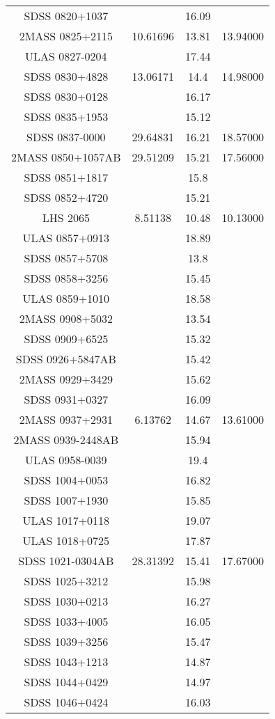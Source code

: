 \begin{table}
\begin{tabular}{cccc}
SDSS 0820+1037 &  & 16.09 &  \\
2MASS 0825+2115 & 10.61696 & 13.81 & 13.94000 \\
ULAS 0827-0204 &  & 17.44 &  \\
SDSS 0830+4828 & 13.06171 & 14.4 & 14.98000 \\
SDSS 0830+0128 &  & 16.17 &  \\
SDSS 0835+1953 &  & 15.12 &  \\
SDSS 0837-0000 & 29.64831 & 16.21 & 18.57000 \\
2MASS 0850+1057AB & 29.51209 & 15.21 & 17.56000 \\
SDSS 0851+1817 &  & 15.8 &  \\
SDSS 0852+4720 &  & 15.21 &  \\
LHS 2065 & 8.51138 & 10.48 & 10.13000 \\
ULAS 0857+0913 &  & 18.89 &  \\
SDSS 0857+5708 &  & 13.8 &  \\
SDSS 0858+3256 &  & 15.45 &  \\
ULAS 0859+1010 &  & 18.58 &  \\
2MASS 0908+5032 &  & 13.54 &  \\
SDSS 0909+6525 &  & 15.32 &  \\
SDSS 0926+5847AB &  & 15.42 &  \\
2MASS 0929+3429 &  & 15.62 &  \\
SDSS 0931+0327 &  & 16.09 &  \\
2MASS 0937+2931 & 6.13762 & 14.67 & 13.61000 \\
2MASS 0939-2448AB &  & 15.94 &  \\
ULAS 0958-0039 &  & 19.4 &  \\
SDSS 1004+0053 &  & 16.82 &  \\
SDSS 1007+1930 &  & 15.85 &  \\
ULAS 1017+0118 &  & 19.07 &  \\
ULAS 1018+0725 &  & 17.87 &  \\
SDSS 1021-0304AB & 28.31392 & 15.41 & 17.67000 \\
SDSS 1025+3212 &  & 15.98 &  \\
SDSS 1030+0213 &  & 16.27 &  \\
SDSS 1033+4005 &  & 16.05 &  \\
SDSS 1039+3256 &  & 15.47 &  \\
SDSS 1043+1213 &  & 14.87 &  \\
SDSS 1044+0429 &  & 14.97 &  \\
SDSS 1046+0424 &  & 16.03 &  \\

\end{tabular}
\end{table}
